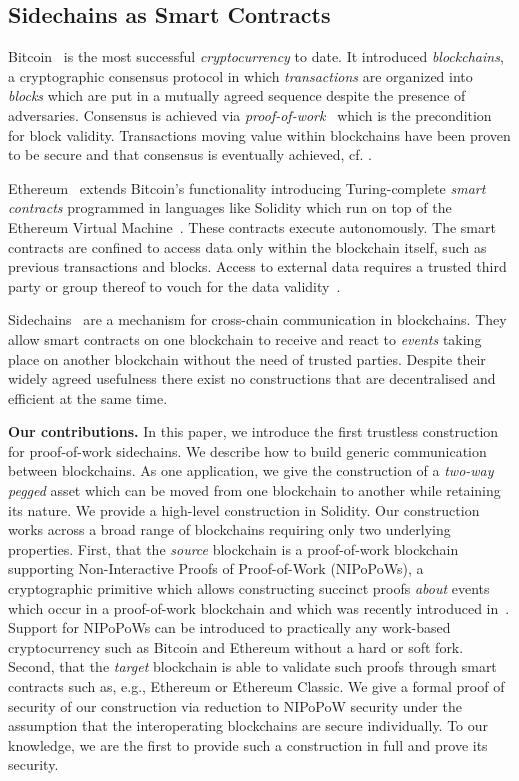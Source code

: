 \subsection{Sidechains as Smart Contracts}


Bitcoin~\cite{bitcoin} is the most successful \emph{cryptocurrency} to
date. It introduced \emph{blockchains}, a
cryptographic consensus protocol in which \emph{transactions} are organized
into \emph{blocks} which are put in a mutually agreed sequence despite the
presence of adversaries. Consensus is achieved via
\emph{proof-of-work}~\cite{pow} which is the precondition for block
validity.  Transactions moving value within blockchains have been proven to
be secure and that consensus is eventually achieved, cf.
\cite{backbone,pass-asynchronous,varbackbone}.

Ethereum~\cite{buterin} extends Bitcoin's functionality introducing
Turing-complete \emph{smart contracts} programmed in
languages like Solidity which run on top of the Ethereum Virtual
Machine~\cite{wood}. These contracts execute autonomously. The smart contracts
are confined to access data only within the blockchain itself, such as previous
transactions and blocks. Access to external data requires a trusted
third party or group thereof to vouch for the data validity~\cite{towncrier}.

Sidechains~\cite{sidechains} are a mechanism for cross-chain communication in
blockchains. They allow smart contracts on one blockchain to receive and
react to \textit{events} taking place on another blockchain without the need
of trusted parties. Despite their widely agreed usefulness
there exist no constructions that are decentralised and efficient at the same
time.

\noindent\textbf{Our contributions. } In this paper, we introduce the first
trustless construction for proof-of-work sidechains. We describe how to build
generic communication between blockchains. As one application, we give the
construction of a \emph{two-way pegged} asset which can be moved from one
blockchain to another while retaining its nature. We provide a high-level
construction in Solidity. Our construction works across a broad range of
blockchains requiring only two underlying properties. First, that the
\emph{source} blockchain is a proof-of-work blockchain supporting
Non-Interactive Proofs of Proof-of-Work (NIPoPoWs), a cryptographic primitive
which allows constructing succinct proofs \emph{about} events which occur in a
proof-of-work blockchain and which was recently introduced in~\cite{nipopows}.
Support for NIPoPoWs can be introduced to practically any
work-based cryptocurrency such as Bitcoin and Ethereum without a hard or soft
fork. Second, that the \emph{target} blockchain is able to validate such proofs
through smart contracts such as, e.g., Ethereum or Ethereum
Classic.
We give a formal proof of security of our construction via
reduction to NIPoPoW security under the assumption that the interoperating
blockchains are secure individually.
To our knowledge, we are the first to
provide such a construction in
full and prove its security.

